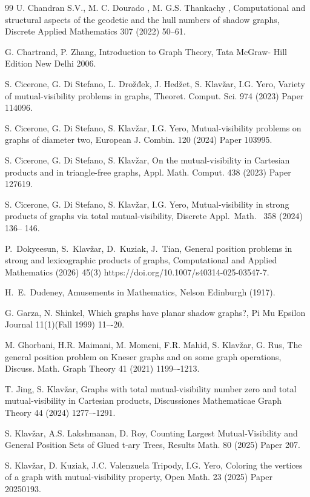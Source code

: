 \documentclass[a4paper,12pt]{article}
\begin{document}
{\begin{thebibliography}{99}
 U. Chandran S.V., M. C. Dourado , M. G.S. Thankachy , Computational and structural aspects of the geodetic and the hull numbers of shadow graphs, Discrete Applied Mathematics 307 (2022) 50--61.

 G. Chartrand, P. Zhang, Introduction to Graph Theory, Tata McGraw- Hill Edition New Delhi 2006.

  S. Cicerone, G. Di Stefano, L. Drožđek, J. Hedžet, S. Klavžar, I.G. Yero, Variety of mutual-visibility problems in graphs, Theoret. Comput. Sci. 974 (2023) Paper 114096.

 S. Cicerone, G. Di Stefano, S. Klavžar, I.G. Yero, Mutual-visibility problems on
graphs of diameter two, European J. Combin. 120 (2024) Paper 103995. 

 S. Cicerone, G. Di Stefano, S. Klavžar, On the mutual-visibility in Cartesian products and in triangle-free graphs, Appl. Math. Comput. 438 (2023) Paper 127619.

 
   S. Cicerone, G. Di Stefano, S. Klavžar, I.G. Yero, Mutual-visibility in strong products of graphs via total mutual-visibility, Discrete Appl.\ Math. \ 358 (2024) 136-- 146.
 

 P.~Dokyeesun, S.~Klav\v{z}ar, D.~Kuziak, J.~Tian, General position problems in strong and lexicographic products of graphs, Computational and Applied Mathematics (2026) 45(3) https://doi.org/10.1007/s40314-025-03547-7.
   
  
  H.~E.~Dudeney,  Amusements in Mathematics, Nelson Edinburgh (1917). 
 
  
   G. Garza, N. Shinkel, Which graphs have planar shadow graphs?, Pi Mu Epsilon Journal 11(1)(Fall 1999) 11–-20.
  
  
   M. Ghorbani, H.R. Maimani, M. Momeni, F.R. Mahid, S. Klavžar, G. Rus, The general position problem on Kneser graphs and on some graph operations, Discuss. Math. Graph Theory 41 (2021) 1199–-1213.
  
   
    T. Jing, S. Klavžar,  Graphs with total mutual-visibility number zero and total mutual-visibility in Cartesian products, Discussiones Mathematicae Graph Theory 44 (2024) 1277–-1291.

  S. Klavžar, A.S. Lakshmanan, D. Roy, Counting Largest Mutual-Visibility and General Position Sets of Glued t-ary Trees, Results Math. 80 (2025) Paper 207.
  
     S. Klavžar, D. Kuziak, J.C. Valenzuela Tripody, I.G. Yero, Coloring the vertices of a graph with mutual-visibility property, Open Math. 23 (2025) Paper 20250193.
    

\end{thebibliography}}
\end{document}
